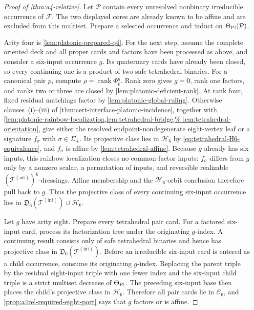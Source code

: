 \documentclass[11pt,letterpaper,onecolumn]{article}
\theoremstyle{plain}
\theoremstyle{definition}
\theoremstyle{remark}
\newcommand{\cF}{\mathcal F}
\newcommand{\TetInt}{{\mathcal T^{(\mathrm{int})}}}
\newcommand{\rank}{\operatorname{rank}}
\begin{document}
\begin{proof}[Proof of \cref{thm:a4-relative}]
Let \(\mathcal P\) contain every unresolved nonbinary irreducible
occurrence of \(\cF\). The two displayed cores are already known to be affine and are
excluded from this multiset.  Prepare a selected occurrence and induct
on \(\Theta_{\rm Pl}(\mathcal P)\).

Arity four is \cref{lem:platonic-prepared-q4}.  For the next step, assume
the complete oriented deck and all proper cards and factors have been
processed as above, and consider a six-input
occurrence \(g\).  Its quaternary cards have already been closed, so every
continuing one is a product of two safe tetrahedral binaries.  For a
canonical pair \(p\), compute \(\rho=\rank\Phi_p^g\).  Rank zero gives
\(g=0\), rank one factors, and ranks two or three are closed by
\cref{lem:platonic-deficient-rank}.  At rank four, fixed residual matchings
factor by \cref{lem:platonic-global-ruling}. Otherwise clauses~\textnormal{(i)--(iii)}
of \cref{thm:cert-interface-platonic-incidence}, together with
\cref{lem:platonic-rainbow-localization,lem:tetrahedral-bridge,%
lem:tetrahedral-orientation}, give either the resolved
endpoint-nondegenerate eight-vertex leaf or a signature
\(f_\sigma\) with \(\sigma\in\Sigma_+\).  Its projective class lies in \(\mathscr H_6\)
by \cref{eq:tetrahedral-H6-equivalence}, and \(f_\sigma\) is affine by
\cref{lem:tetrahedral-affine}.  Because \(g\) already has six inputs, this
rainbow localization closes no common-factor inputs: \(f_\sigma\) differs
from \(g\) only by a nonzero scalar, a permutation of inputs, and reversible
realizable \((\TetInt)^6\)-dressings.  Affine membership and the
\(\mathscr H_6\)-orbit conclusion therefore pull back to \(g\).  Thus the projective class of every continuing six-input occurrence
lies in \(\mathfrak D_6(\TetInt)\cup\mathscr H_6\).

Let \(g\) have arity eight.  Prepare every tetrahedral pair card.
For a factored six-input card, process its factorization tree under the
originating \(g\)-index. A continuing result consists only of safe
tetrahedral binaries and hence has projective class in \(\mathfrak D_6(\TetInt)\).  Before an
irreducible six-input card is entered as a child occurrence, consume its
originating \(g\)-index.  Replacing the parent triple by the residual
eight-input triple with one fewer index and the six-input child triple is a
strict multiset decrease of \(\Theta_{\rm Pl}\).  The preceding six-input
base then places the child's projective class in \(\mathscr H_6\).  Therefore all pair cards
lie in \(\mathscr C_6\), and
\cref{prop:a4rel-required-eight-port} says that \(g\) factors or is affine.


\end{proof}
\end{document}
